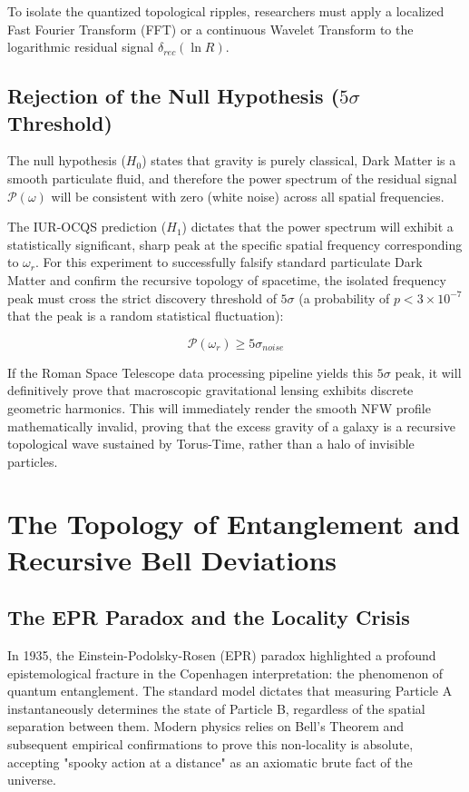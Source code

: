 \documentclass[12pt,openany]{book}
\begin{document}
To isolate the quantized topological ripples, researchers must apply a localized Fast Fourier Transform (FFT) or a continuous Wavelet Transform to the logarithmic residual signal $\delta_{rec}(\ln R)$.

\section{Rejection of the Null Hypothesis ($5\sigma$ Threshold)}
The null hypothesis ($H_0$) states that gravity is purely classical, Dark Matter is a smooth particulate fluid, and therefore the power spectrum of the residual signal $\mathcal{P}(\omega)$ will be consistent with zero (white noise) across all spatial frequencies.

The IUR-OCQS prediction ($H_1$) dictates that the power spectrum will exhibit a statistically significant, sharp peak at the specific spatial frequency corresponding to $\omega_r$. For this experiment to successfully falsify standard particulate Dark Matter and confirm the recursive topology of spacetime, the isolated frequency peak must cross the strict discovery threshold of $5\sigma$ (a probability of $p < 3 \times 10^{-7}$ that the peak is a random statistical fluctuation):

\begin{equation}
\mathcal{P}(\omega_r) \ge 5\sigma_{noise}
\end{equation}

If the Roman Space Telescope data processing pipeline yields this $5\sigma$ peak, it will definitively prove that macroscopic gravitational lensing exhibits discrete geometric harmonics. This will immediately render the smooth NFW profile mathematically invalid, proving that the excess gravity of a galaxy is a recursive topological wave sustained by Torus-Time, rather than a halo of invisible particles.
\chapter{The Topology of Entanglement and Recursive Bell Deviations}

\section{The EPR Paradox and the Locality Crisis}
In 1935, the Einstein-Podolsky-Rosen (EPR) paradox highlighted a profound epistemological fracture in the Copenhagen interpretation: the phenomenon of quantum entanglement. The standard model dictates that measuring Particle A instantaneously determines the state of Particle B, regardless of the spatial separation between them. Modern physics relies on Bell's Theorem and subsequent empirical confirmations to prove this non-locality is absolute, accepting "spooky action at a distance" as an axiomatic brute fact of the universe.
\end{document}
